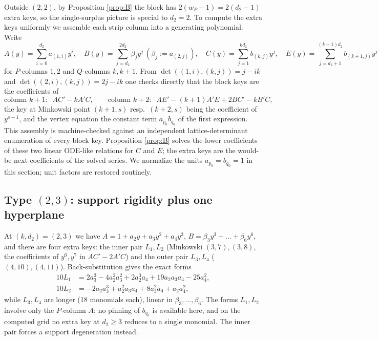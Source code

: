 \documentclass[11pt]{article}
\theoremstyle{definition}
\theoremstyle{remark}
\begin{document}
Outside $(2,2)$, by Proposition \ref{prop:B} the block has $2(w_P-1)=2(d_2-1)$ extra keys, so the single-surplus picture is special to $d_2=2$. To compute the extra keys uniformly we assemble each strip column into a generating polynomial. Write
\[
A(y)=\sum_{i=0}^{d_2} a_{(1,i)}y^i,\quad
B(y)=\sum_{j=d_2}^{2d_2} \beta_j y^j\ (\beta_j:=a_{(2,j)}),\quad
C(y)=\sum_{j=1}^{kd_2} b_{(k,j)}y^j,\quad
E(y)=\sum_{j=d_2+1}^{(k+1)d_2} b_{(k+1,j)}y^j
\]
for $P$-columns $1,2$ and $Q$-columns $k,k+1$. From $\det((1,i),(k,j))=j-ik$ and $\det((2,i),(k,j))=2j-ik$ one checks directly that the block keys are the coefficients of
\begin{equation}\label{eq:odes}
\text{column } k{+}1:\;\; AC'-kA'C, \qquad
\text{column } k{+}2:\;\; AE'-(k{+}1)A'E+2BC'-kB'C,
\end{equation}
the key at Minkowski point $(k{+}1,s)$ resp.\ $(k{+}2,s)$ being the coefficient of $y^{s-1}$, and the vertex equation the constant term $a_{p_0}b_{q_0}$ of the first expression. This assembly is machine-checked against an independent lattice-determinant enumeration of every block key. Proposition \ref{prop:B} solves the lower coefficients of these two linear ODE-like relations for $C$ and $E$; the extra keys are the would-be next coefficients of the solved series. We normalize the units $a_{p_0}=b_{q_0}=1$ in this section; unit factors are restored routinely.

\subsection{Type $(2,3)$: support rigidity plus one hyperplane}

At $(k,d_2)=(2,3)$ we have $A=1+a_2y+a_3y^2+a_4y^3$, $B=\beta_3y^3+\dots+\beta_6y^6$, and there are four extra keys: the inner pair $L_1,L_2$ (Minkowski $(3,7),(3,8)$, the coefficients of $y^6,y^7$ in $AC'-2A'C$) and the outer pair $L_3,L_4$ ($(4,10),(4,11)$). Back-substitution gives the exact forms
\begin{align*}
10L_1&=2a_3^3-4a_2^2a_3^2+2a_2^3a_4+19a_2a_3a_4-25a_4^2,\\
10L_2&=-2a_2a_3^3+a_2^2a_3a_4+8a_3^2a_4+a_2a_4^2,
\end{align*}
while $L_3,L_4$ are longer (18 monomials each), linear in $\beta_3,\dots,\beta_6$. The forms $L_1,L_2$ involve only the $P$-column $A$: no pinning of $b_{q_0}$ is available here, and on the computed grid no extra key at $d_2\geq 3$ reduces to a single monomial. The inner pair forces a support degeneration instead.
\end{document}
